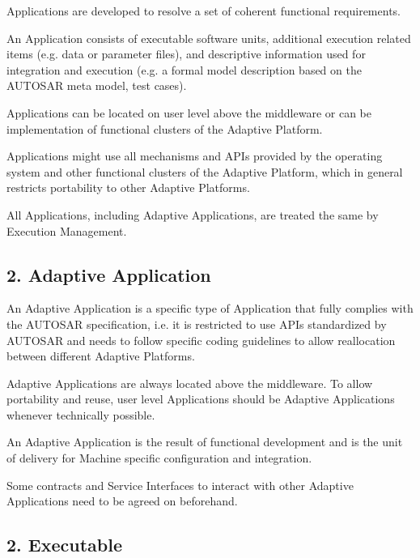 \begin{DoxyItemize}
\item Applications are developed to resolve a set of coherent functional requirements.
\item An Application consists of executable software units, additional execution related items (e.\+g. data or parameter files), and descriptive information used for integration and execution (e.\+g. a formal model description based on the A\+U\+T\+O\+S\+AR meta model, test cases).
\item Applications can be located on user level above the middleware or can be implementation of functional clusters of the Adaptive Platform.
\item Applications might use all mechanisms and A\+P\+Is provided by the operating system and other functional clusters of the Adaptive Platform, which in general restricts portability to other Adaptive Platforms.
\item All Applications, including Adaptive Applications, are treated the same by Execution Management.
\end{DoxyItemize}

\subsection*{2. {\bfseries Adaptive Application}}


\begin{DoxyItemize}
\item An Adaptive Application is a specific type of Application that fully complies with the A\+U\+T\+O\+S\+AR specification, i.\+e. it is restricted to use A\+P\+Is standardized by A\+U\+T\+O\+S\+AR and needs to follow specific coding guidelines to allow reallocation between different Adaptive Platforms.
\item Adaptive Applications are always located above the middleware. To allow portability and reuse, user level Applications should be Adaptive Applications whenever technically possible.
\item An Adaptive Application is the result of functional development and is the unit of delivery for Machine specific configuration and integration.
\item Some contracts and Service Interfaces to interact with other Adaptive Applications need to be agreed on beforehand.
\end{DoxyItemize}

\subsection*{2. {\bfseries Executable}}


